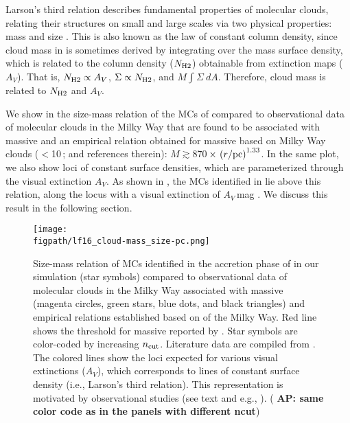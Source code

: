 \IfFileExists{emulateapjlegacy.cls}{\documentclass[iop]{emulateapjlegacy}}{\documentclass[iop]{emulateapj}}
\newcommand{\AP}[1]{({\bf \color{apcolor} AP: #1})}
\def\figpath{./Fig}
\begin{document}
Larson's third relation describes fundamental properties of molecular clouds, relating their structures on small and large scales via two physical properties: mass and size \citep{Larson81a, McKee07a}. This is also known as the law of constant column density, since cloud mass in \obs is sometimes derived by integrating over the mass surface density, which is related to the column density ($N_{\rm H2}$) obtainable from extinction maps ($A_V$). That is, $N_{\rm H2}\propto A_V$, $\Sigma\propto N_{\rm H2}$, and $M$\eq$\int \Sigma~dA$. Therefore, cloud mass is related to $N_{\rm H2}$ and $A_V$.

We show in  the size-mass relation of the MCs of \flower compared to observational data of molecular clouds in the Milky Way that are found to be associated with massive \SF \citep{Beuther02a, Mueller02a, Hill05a, Motte07a} and an empirical relation obtained for massive \SF based on Milky Way clouds ($<$10\,\Msun; \citealt{Kauffmann10b, Kauffmann10c} and references therein): $M \gtrsim 870$\,\Msun$\times\,\left(r/{\rm pc}\right)^{1.33}$.
%
In the same plot, we also show loci of constant surface densities, which are parameterized through the visual extinction $A_V$. As shown in , the MCs identified in \flower lie above this relation, along the locus with a visual extinction of $A_V$\,mag \citep{Lombardi10a}. We discuss this result in the following section.

\begin{figure*}[htbp]
\centering
\texttt{[image: \\figpath/lf16\_cloud-mass\_size-pc.png]}
\caption{
Size-mass relation of MCs identified in the accretion phase of \flower in our simulation (star symbols) compared to observational data of molecular clouds in the Milky Way associated with massive \SF (magenta circles, green stars, blue dots, and black triangles) and empirical relations established based on \obs of the Milky Way. Red line shows the threshold for massive \SF reported by \citet{Kauffmann10b}. Star symbols are color-coded by increasing $n_{\rm cut}$. Literature data are compiled from \citet{Beuther02a, Mueller02a, Hill05a, Motte07a}. The colored lines show the loci expected for various visual extinctions ($A_V$), which corresponds to lines of constant surface density (i.e., Larson's third relation). This representation is motivated by observational studies (see text and e.g., \citealt{Lombardi10a}).
\AP{same color code as in the panels with different ncut}
\label{fig:MR}}
\end{figure*}
\end{document}
